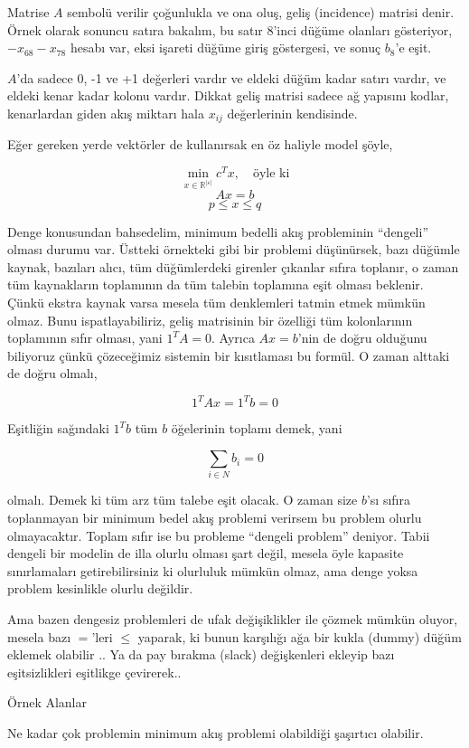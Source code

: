 \documentclass[12pt,fleqn]{article}\usepackage{../../common}
\begin{document}
Matrise $A$ sembolü verilir çoğunlukla ve ona oluş, geliş (incidence)
matrisi denir.  Örnek olarak sonuncu satıra bakalım, bu satır 8'inci düğüme
olanları gösteriyor, $-x_{68}-x_{78}$ hesabı var, eksi işareti düğüme giriş
göstergesi, ve sonuç $b_8$'e eşit. 

$A$'da sadece 0, -1 ve +1 değerleri vardır ve eldeki düğüm kadar satırı
vardır, ve eldeki kenar kadar kolonu vardır. Dikkat geliş matrisi sadece ağ
yapısını kodlar, kenarlardan giden akış miktarı hala $x_{ij}$ değerlerinin
kendisinde. 

Eğer gereken yerde vektörler de kullanırsak en öz haliyle model şöyle,

$$
\min_{x \in \mathbb{R}^{|\varepsilon|}} c^T x, \quad \textrm{öyle ki}
$$
$$
Ax = b
$$
$$
p \le x \le q
$$

Denge konusundan bahsedelim, minimum bedelli akış probleminin ``dengeli''
olması durumu var. Üstteki örnekteki gibi bir problemi düşünürsek, bazı
düğümle kaynak, bazıları alıcı, tüm düğümlerdeki girenler çıkanlar sıfıra
toplanır, o zaman tüm kaynakların toplamının da tüm talebin toplamına eşit
olması beklenir. Çünkü ekstra kaynak varsa mesela tüm denklemleri tatmin
etmek mümkün olmaz. Bunu ispatlayabiliriz, geliş matrisinin bir özelliği
tüm kolonlarının toplamının sıfır olması, yani $1^T A = 0$. Ayrıca $Ax =
b$'nin de doğru olduğunu biliyoruz çünkü çözeceğimiz sistemin bir
kısıtlaması bu formül. O zaman alttaki de doğru olmalı, 

$$
1^T A x = 1^T b = 0
$$

Eşitliğin sağındaki $1^T b$ tüm $b$ öğelerinin toplamı demek, yani

$$
\sum _{i \in N} b_i = 0
$$

olmalı. Demek ki tüm arz tüm talebe eşit olacak. O zaman size $b$'sı sıfıra
toplanmayan bir minimum bedel akış problemi verirsem bu problem olurlu
olmayacaktır. Toplam sıfır ise bu probleme ``dengeli problem''
deniyor. Tabii dengeli bir modelin de illa olurlu olması şart değil, mesela
öyle kapasite sınırlamaları getirebilirsiniz ki olurluluk mümkün olmaz, ama
denge yoksa problem kesinlikle olurlu değildir.

Ama bazen dengesiz problemleri de ufak değişiklikler ile çözmek mümkün
oluyor, mesela bazı $=$'leri $\le$ yaparak, ki bunun karşılığı ağa bir
kukla (dummy) düğüm eklemek olabilir .. Ya da pay bırakma (slack)
değişkenleri ekleyip bazı eşitsizlikleri eşitlikge çevirerek..

Örnek Alanlar 

Ne kadar çok problemin minimum akış problemi olabildiği şaşırtıcı
olabilir. 
\end{document}
